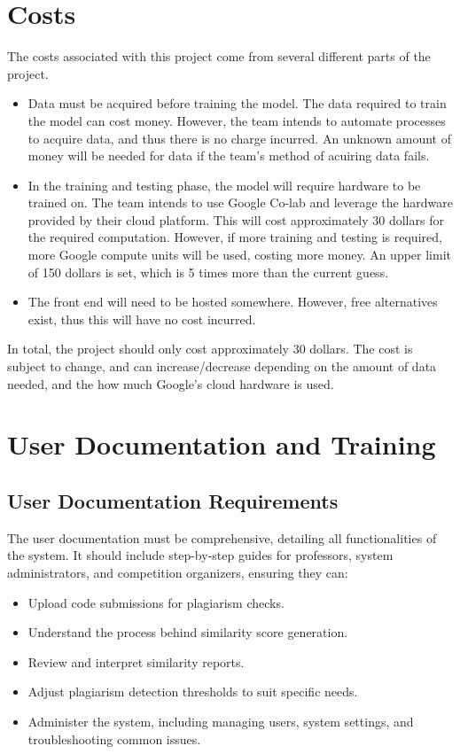 \documentclass[12pt]{article}
\begin{document}
\section{Costs}
The costs associated with this project come from several different parts of the project.
\begin{itemize}
    \item Data must be acquired before training the model. The data required to
    train the model can cost money. However, the team intends to automate
    processes to acquire data, and thus there is no charge incurred. An unknown
    amount of money will be needed for data if the team's method of acuiring
    data fails.
    \item In the training and testing phase, the model will require hardware to
    be trained on. The team intends to use Google Co-lab and leverage the
    hardware provided by their cloud platform. This will cost approximately 30
    dollars for the required computation. However, if more training and testing
    is required, more Google compute units will be used, costing more money. An
    upper limit of 150 dollars is set, which is 5 times more than the current
    guess. 
    \item The front end will need to be hosted somewhere. However, free
    alternatives exist, thus this will have no cost incurred.

\end{itemize}
In total, the project should only cost approximately 30 dollars. The cost is
subject to change, and can increase/decrease depending on the amount of data
needed, and the how much Google's cloud hardware is used.

\section{User Documentation and Training}

\subsection{User Documentation Requirements}
The user documentation must be comprehensive, detailing all functionalities of the system. It should include step-by-step guides for professors, system administrators, and competition organizers, ensuring they can:
\begin{itemize}
    \item Upload code submissions for plagiarism checks.
    \item Understand the process behind similarity score generation.
    \item Review and interpret similarity reports.
    \item Adjust plagiarism detection thresholds to suit specific needs.
    \item Administer the system, including managing users, system settings, and troubleshooting common issues.
\end{itemize}
\end{document}
